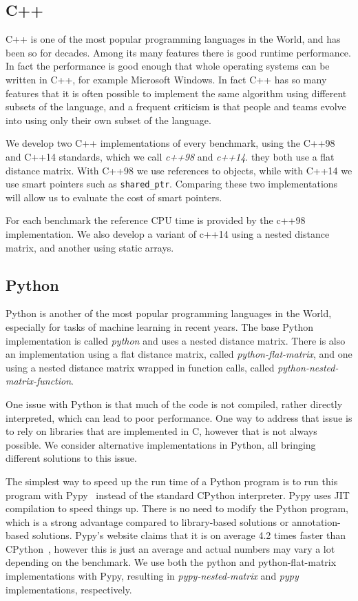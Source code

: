 \documentclass[11pt,a4paper,notitlepage]{article}
\begin{document}
\subsection{C++}
C++ is one of the most popular programming languages in the World, and
has been so for decades. Among its many features there is good
runtime performance. In fact the performance is good enough that whole
operating systems can be written in C++, for example Microsoft
Windows. In fact C++ has so many features that it is often possible to
implement the same algorithm using different subsets of the language,
and a frequent criticism is that people and teams evolve into using
only their own subset of the language.

We develop two C++ implementations of every benchmark, using the C++98
and C++14 standards, which we call \emph{c++98} and \emph{c++14}. they
both use a flat distance matrix. With C++98 we use references to
objects, while with C++14 we use smart pointers such as
\verb|shared_ptr|. Comparing these two implementations will allow us
to evaluate the cost of smart pointers.

For each benchmark the reference CPU time is provided by the c++98
implementation. We also develop a variant of c++14 using a nested
distance matrix, and another using static arrays.

\subsection{Python}
Python is another of the most popular programming languages in the
World, especially for tasks of machine learning in recent years. The
base Python implementation is called \emph{python} and uses a nested
distance matrix. There is also an implementation using a flat distance
matrix, called \emph{python-flat-matrix}, and one using a nested
distance matrix wrapped in function calls, called
\emph{python-nested-matrix-function}.

One issue with Python is that much of the code is not compiled, rather
directly interpreted, which can lead to poor performance. One way to
address that issue is to rely on libraries that are implemented in C,
however that is not always possible. We consider alternative
implementations in Python, all bringing different solutions to this
issue.

The simplest way to speed up the run time of a Python program is
to run this program with Pypy~\cite{pypy} instead of the
standard CPython interpreter. Pypy uses JIT compilation to speed
things up. There is no need to modify the Python program, which is a
strong advantage compared to library-based solutions or
annotation-based solutions. Pypy's website claims that it is on
average 4.2 times faster than CPython~\cite{pypy}, however this is
just an average and actual numbers may vary a lot depending on the
benchmark. We use both the python and python-flat-matrix
implementations with Pypy, resulting in \emph{pypy-nested-matrix} and
\emph{pypy} implementations, respectively.
\end{document}
